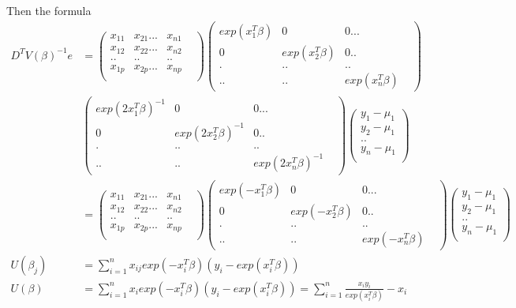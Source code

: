 \documentclass[11pt]{article} %
\begin{document}
Then the formula
\begin{align*}
	 D^T V(\beta)^{-1} e &=  \begin{pmatrix}
	 	x_{11} & x_{21} ... & x_{n1}  \\
	 	x_{12} & x_{22} ... & x_{n2}  \\
	 	.. &.. & ..&  \\
	 	x_{1p} & x_{2p} ... & x_{np} \\
	 \end{pmatrix} \begin{pmatrix}
	 exp(x_1^T \beta) & 0  & 0...& \\
	 0 & exp(x_2^T \beta) & 0 ..& \\
	 .&..&..&  \\
	 ..& ..&  exp(x_n^T \beta)
 \end{pmatrix}\\
& \begin{pmatrix}
 exp(2 x_1^T \beta)^{-1} & 0  & 0...& \\
 0 & exp(2 x_2^T \beta)^{-1} & 0 ..& \\
 .&..&..&  \\
 ..& ..&  exp(2 x_n^T \beta)^{-1}
\end{pmatrix} \begin{pmatrix}
y_{1} - \mu_1  \\
y_{2}- \mu_1 \\
..  \\
y_{n}- \mu_1\\
\end{pmatrix}\\
&= \begin{pmatrix}
	x_{11} & x_{21} ... & x_{n1}  \\
	x_{12} & x_{22} ... & x_{n2}  \\
	.. &.. & ..&  \\
	x_{1p} & x_{2p} ... & x_{np} \\
\end{pmatrix} \begin{pmatrix}
	exp(-x_1^T \beta) & 0  & 0...& \\
	0 & exp(-x_2^T \beta) & 0 ..& \\
	.&..&..&  \\
	..& ..&  exp(-x_n^T \beta)
\end{pmatrix}\begin{pmatrix}
y_{1} - \mu_1  \\
y_{2}- \mu_1 \\
..  \\
y_{n}- \mu_1\\
\end{pmatrix}\\
U(\beta_j) &= \sum_{i=1}^n x_{ij} exp(-x_i^T \beta) (y_i - exp(x_i^T \beta))\\
U(\beta) &= \sum_{i=1}^n x_{i} exp(-x_i^T \beta) (y_i - exp(x_i^T \beta)) = \sum_{i=1}^n \frac{x_i y_i}{exp(x_i^T \beta)} - x_i
\end{align*}
\end{document}
